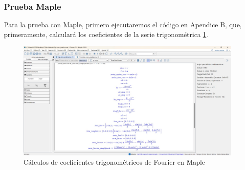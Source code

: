 \subsubsection{Prueba Maple}
Para la prueba con Maple, primero ejecutaremos el código en \hyperref[app2:trig-code-maple]{Apendice B}, que, primeramente, calculará los coeficientes de la serie trigonométrica \ref{fig:maple-trig-series}. 
\begin{figure}[H]
	\centering
	\includegraphics[width=1\textwidth]{img/chapter02/maple-trig-series-coeff.jpeg}
	\caption{Cálculos de coeficientes trigonométricos de Fourier en Maple}
	\label{fig:maple-trig-series}  %
\end{figure}

